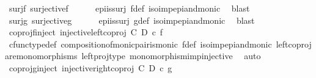 \begin{isabellebody}
\ surj{\isacharunderscore}{\kern0pt}f{\isacharcolon}{\kern0pt}\ {\isachardoublequoteopen}surjective{\isacharparenleft}{\kern0pt}f{\isacharparenright}{\kern0pt}{\isachardoublequoteclose}\isanewline
\ \ \ \ \isamarkupfalse%
\ epi{\isacharunderscore}{\kern0pt}is{\isacharunderscore}{\kern0pt}surj\ f{\isacharunderscore}{\kern0pt}def\ iso{\isacharunderscore}{\kern0pt}imp{\isacharunderscore}{\kern0pt}epi{\isacharunderscore}{\kern0pt}and{\isacharunderscore}{\kern0pt}monic\ \isamarkupfalse%
\ blast\isanewline
\ \ \isamarkupfalse%
\ surj{\isacharunderscore}{\kern0pt}g{\isacharcolon}{\kern0pt}\ {\isachardoublequoteopen}surjective{\isacharparenleft}{\kern0pt}g{\isacharparenright}{\kern0pt}{\isachardoublequoteclose}\isanewline
\ \ \ \ \isamarkupfalse%
\ epi{\isacharunderscore}{\kern0pt}is{\isacharunderscore}{\kern0pt}surj\ g{\isacharunderscore}{\kern0pt}def\ iso{\isacharunderscore}{\kern0pt}imp{\isacharunderscore}{\kern0pt}epi{\isacharunderscore}{\kern0pt}and{\isacharunderscore}{\kern0pt}monic\ \isamarkupfalse%
\ blast\isanewline
\isanewline
\ \ \isamarkupfalse%
\ coproj{\isacharunderscore}{\kern0pt}f{\isacharunderscore}{\kern0pt}inject{\isacharcolon}{\kern0pt}\ {\isachardoublequoteopen}injective{\isacharparenleft}{\kern0pt}{\isacharparenleft}{\kern0pt}{\isacharparenleft}{\kern0pt}left{\isacharunderscore}{\kern0pt}coproj\ C\ D{\isacharparenright}{\kern0pt}\ {\isasymcirc}\isactrlsub c\ f{\isacharparenright}{\kern0pt}{\isacharparenright}{\kern0pt}{\isachardoublequoteclose}\isanewline
\ \ \ \ \isamarkupfalse%
\ cfunc{\isacharunderscore}{\kern0pt}type{\isacharunderscore}{\kern0pt}def\ composition{\isacharunderscore}{\kern0pt}of{\isacharunderscore}{\kern0pt}monic{\isacharunderscore}{\kern0pt}pair{\isacharunderscore}{\kern0pt}is{\isacharunderscore}{\kern0pt}monic\ f{\isacharunderscore}{\kern0pt}def\ iso{\isacharunderscore}{\kern0pt}imp{\isacharunderscore}{\kern0pt}epi{\isacharunderscore}{\kern0pt}and{\isacharunderscore}{\kern0pt}monic\ left{\isacharunderscore}{\kern0pt}coproj{\isacharunderscore}{\kern0pt}are{\isacharunderscore}{\kern0pt}monomorphisms\ left{\isacharunderscore}{\kern0pt}proj{\isacharunderscore}{\kern0pt}type\ monomorphism{\isacharunderscore}{\kern0pt}imp{\isacharunderscore}{\kern0pt}injective\ \isamarkupfalse%
\ auto\isanewline
\ \ \ \ \isanewline
\ \ \isamarkupfalse%
\ coproj{\isacharunderscore}{\kern0pt}g{\isacharunderscore}{\kern0pt}inject{\isacharcolon}{\kern0pt}\ {\isachardoublequoteopen}injective{\isacharparenleft}{\kern0pt}{\isacharparenleft}{\kern0pt}{\isacharparenleft}{\kern0pt}right{\isacharunderscore}{\kern0pt}coproj\ C\ D{\isacharparenright}{\kern0pt}\ {\isasymcirc}\isactrlsub c\ g{\isacharparenright}{\kern0pt}{\isacharparenright}{\kern0pt}{\isachardoublequoteclose}\isanewline

\end{isabellebody}
